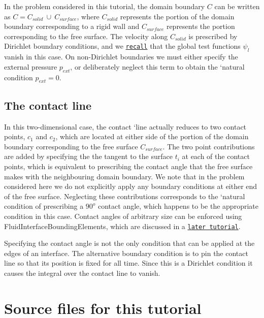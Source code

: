 In the problem considered in this tutorial, the domain boundary $ C $ can be written as $ C = C_{solid} \ \cup \ C_{surface} $, where $ C_{solid} $ represents the portion of the domain boundary corresponding to a rigid wall and $ C_{surface} $ represents the portion corresponding to the free surface. The velocity along $ C_{solid} $ is prescribed by Dirichlet boundary conditions, and we \href{../../../intro/html/index.html#galerkin}{\tt recall} that the global test functions $ \psi_l $ vanish in this case. On non-\/\+Dirichlet boundaries we must either specify the external pressure $ p_{ext} $, or deliberately neglect this term to obtain the `natural\textquotesingle{} condition $ p_{ext} = 0 $.\hypertarget{index_contact_line}{}\subsection{The contact line}\label{index_contact_line}
In this two-\/dimensional case, the contact `line\textquotesingle{} actually reduces to two contact points, $ c_1 $ and $ c_2 $, which are located at either side of the portion of the domain boundary corresponding to the free surface $ C_{surface} $. The two point contributions are added by specifying the the tangent to the surface $ t_i $ at each of the contact points, which is equivalent to prescribing the contact angle that the free surface makes with the neighbouring domain boundary. We note that in the problem considered here we do not explicitly apply any boundary conditions at either end of the free surface. Neglecting these contributions corresponds to the `natural\textquotesingle{} condition of prescribing a $ 90^o $ contact angle, which happens to be the appropriate condition in this case. Contact angles of arbitrary size can be enforced using {\ttfamily Fluid\+Interface\+Bounding\+Elements}, which are discussed in a \href{../../static_single_layer/html/index.html#contact_angle}{\tt later tutorial}.

Specifying the contact angle is not the only condition that can be applied at the edges of an interface. The alternative boundary condition is to pin the contact line so that its position is fixed for all time. Since this is a Dirichlet condition it causes the integral over the contact line to vanish.



 

\hypertarget{index_sources}{}\section{Source files for this tutorial}\label{index_sources}

